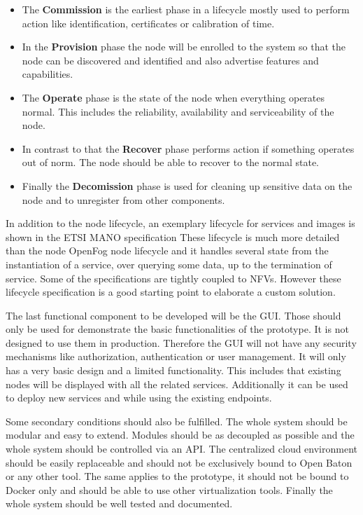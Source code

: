 \begin{itemize}
  \item The \textbf{Commission} is the earliest phase in a lifecycle mostly used to perform action like identification, certificates or calibration of time.\autocite[p. 52 f.]{OpenFog:2017}
  \item In the \textbf{Provision} phase the node will be enrolled to the system so that the node can be discovered and identified and also advertise features and capabilities.\autocite[p. 52 f.]{OpenFog:2017}
  \item The \textbf{Operate} phase is the state of the node when everything operates normal. This includes the reliability, availability and serviceability of the node.\autocite[p. 53]{OpenFog:2017}
  \item In contrast to that the \textbf{Recover} phase performs action if something operates out of norm.\autocite[p. 53]{OpenFog:2017} The node should be able to recover to the normal state.\autocite[p. 53]{OpenFog:2017}
  \item Finally the \textbf{Decomission} phase is used for cleaning up sensitive data on the node and to unregister from other components.\autocite[p. 53]{OpenFog:2017}
\end{itemize}

In addition to the node lifecycle, an exemplary lifecycle for services and images is shown in the \ac{ETSI} \ac{MANO} specification\autocite[p. 67 ff.]{ETSI:MANO:2014}
These lifecycle is much more detailed than the node OpenFog node lifecycle and it handles several state from the instantiation of a service, over querying some data, up to the termination of service.
Some of the specifications are tightly coupled to \acp{NFV}.
However these lifecycle specification is a good starting point to elaborate a custom solution.

The last functional component to be developed will be the \ac{GUI}.
Those should only be used for demonstrate the basic functionalities of the prototype.
It is not designed to use them in production.
Therefore the \ac{GUI} will not have any security mechanisms like authorization, authentication or user management.
It will only has a very basic design and a limited functionality.
This includes that existing nodes will be displayed with all the related services.
Additionally it can be used to deploy new services and while using the existing endpoints.

Some secondary conditions should also be fulfilled.
The whole system should be modular and easy to extend.
Modules should be as decoupled as possible and the whole system should be controlled via an \ac{API}.
The centralized cloud environment should be easily replaceable and should not be exclusively bound to Open Baton or any other tool.
The same applies to the prototype, it should not be bound to Docker only and should be able to use other virtualization tools.
Finally the whole system should be well tested and documented.


